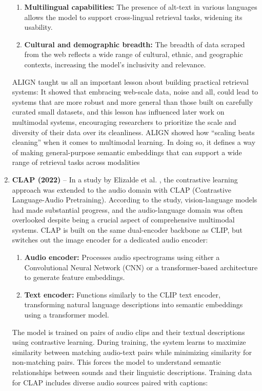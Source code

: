 \documentclass[conference]{IEEEtran}
\begin{document}
\begin{enumerate}
\begin{enumerate}
    \item \textbf{Multilingual capabilities:} The presence of alt-text in various languages allows the model to support cross-lingual retrieval tasks, widening its usability.
    
    \item \textbf{Cultural and demographic breadth:} The breadth of data scraped from the web reflects a wide range of cultural, ethnic, and geographic contexts, increasing the model’s inclusivity and relevance.
\end{enumerate}

ALIGN taught us all an important lesson about building practical retrieval systems: It showed that embracing web-scale data, noise and all, could lead to systems that are more robust and more general than those built on carefully curated small datasets, and this lesson has influenced later work on multimodal systems, encouraging researchers to prioritize the scale and diversity of their data over its cleanliness.
ALIGN showed how “scaling beats cleaning” when it comes to multimodal learning. In doing so, it defines a way of making general-purpose semantic embeddings that can support a wide range of retrieval tasks across modalities
    

\item \textbf{CLAP (2022)} – In a study by Elizalde et al. \cite{elizalde2023clap}, the contrastive learning approach was extended to the audio domain with CLAP (Contrastive Language-Audio Pretraining). According to the study, vision-language models had made substantial progress, and the audio-language domain was often overlooked despite being a crucial aspect of comprehensive multimodal systems.
CLAP is built on the same dual-encoder backbone as CLIP, but switches out the image encoder for a dedicated audio encoder:

\begin{enumerate}
    \item \textbf{Audio encoder:} Processes audio spectrograms using either a Convolutional Neural Network (CNN) or a transformer-based architecture to generate feature embeddings.
    
    \item \textbf{Text encoder:} Functions similarly to the CLIP text encoder, transforming natural language descriptions into semantic embeddings using a transformer model.
\end{enumerate}

The model is trained on pairs of audio clips and their textual descriptions using contrastive learning. During training, the system learns to maximize similarity between matching audio-text pairs while minimizing similarity for non-matching pairs. This forces the model to understand semantic relationships between sounds and their linguistic descriptions.
Training data for CLAP includes diverse audio sources paired with captions:


\end{enumerate}
\end{document}
